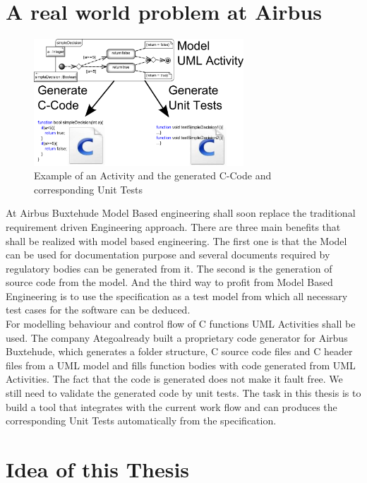\section{A real world problem at Airbus}
\begin{figure}
\label{fig:Act2Code+Tests}
\includegraphics[width=0.7\textwidth]{./pics/Activity2Code+Tests.png}
\caption{Example of an Activity and the generated C-Code and corresponding Unit Tests}
\end{figure}
At Airbus Buxtehude Model Based engineering shall soon replace the traditional requirement driven Engineering approach. There are three main benefits that shall be realized with model based engineering. The first one is that the Model can be used for documentation purpose and several documents required by regulatory bodies can be generated from it. The second is the generation of source code from the model. And the third way to profit from Model Based Engineering is to use the specification as a test model from which all necessary test cases for the software can be deduced.\\
For modelling behaviour and control flow of C functions UML Activities shall be used. The company Atego\textregistered already built a proprietary code generator for Airbus Buxtehude, which generates a folder structure, C source code files and C header files from a UML model and fills function bodies with code generated from UML Activities. The fact that the code is generated does not make it fault free. We still need to validate the generated code by unit tests. The task in this thesis is to build a tool that integrates with the current work flow and can produces the corresponding Unit Tests automatically from the specification.

\section{Idea of this Thesis}
